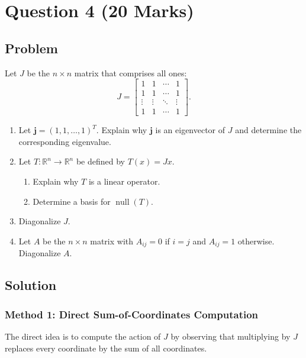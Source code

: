 \documentclass[12pt]{article}
\newcommand{\R}{\mathbb{R}}
\newcommand{\Null}{\operatorname{null}}
\begin{document}
\newpage
\section{Question 4 \hfill (20 Marks)}

\subsection{Problem}
Let $J$ be the $n\times n$ matrix that comprises all ones:
\[
J=\begin{bmatrix}1&1&\cdots&1\\1&1&\cdots&1\\\vdots&\vdots&\ddots&\vdots\\1&1&\cdots&1\end{bmatrix}.
\]
\begin{enumerate}[label=(\alph*)]
  \item Let $\mathbf j=(1,1,\ldots,1)^T$. Explain why $\mathbf j$ is an eigenvector of $J$ and determine the corresponding eigenvalue.
  \item Let $T:\R^n\to\R^n$ be defined by $T(x)=Jx$.
  \begin{enumerate}[label=(\roman*)]
    \item Explain why $T$ is a linear operator.
    \item Determine a basis for $\Null(T)$.
  \end{enumerate}
  \item Diagonalize $J$.
  \item Let $A$ be the $n\times n$ matrix with $A_{ij}=0$ if $i=j$ and $A_{ij}=1$ otherwise. Diagonalize $A$.
\end{enumerate}

\bigskip
\subsection{Solution}


\subsubsection{Method 1: Direct Sum-of-Coordinates Computation}
The direct idea is to compute the action of $J$ by observing that multiplying by $J$ replaces every coordinate by the sum of all coordinates.
\end{document}
